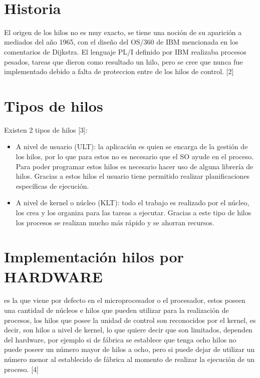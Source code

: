 \documentclass{article}
\begin{document}
\\[0,5cm]


\section{Historia}
El origen de los hilos no es muy exacto, se tiene una noción de su aparición a mediados del año 1965, con el diseño del OS/360 de IBM mencionada en los comentarios de Dijkstra. El lenguaje PL/I definido por IBM realizaba procesos pesados, tareas que dieron como resultado un hilo, pero se cree que nunca fue implementado debido a falta de proteccion entre de los hilos de control. [2]
\\[0.5cm]

\section{Tipos de hilos}

Existen 2 tipos de hilos [3]:

\begin{itemize}
\item  A nivel de usuario (ULT): la aplicación es quien se encarga de la gestión de los hilos, por lo que para estos no es necesario que el SO ayude en el proceso. Para poder programar estos hilos es necesario hacer uso de alguna librería de hilos. Gracias a estos hilos el usuario tiene permitido realizar planificaciones específicas de ejecución.
\item A nivel de kernel o núcleo (KLT): todo el trabajo es realizado por el núcleo, los crea y los organiza para las tareas a ejecutar. Gracias a este tipo de hilos los procesos se realizan mucho más rápido y se ahorran recursos.
\end{itemize}

\section{Implementación hilos por HARDWARE}
es la que viene por defecto en el microprocesador o el procesador, estos poseen una cantidad de núcleos e hilos que pueden utilizar para la realización de procesos, los hilos que posee la unidad de control son reconocidos por el kernel, es decir, son hilos a nivel de kernel, lo que quiere decir que son limitados, dependen del hardware, por ejemplo si de fábrica se establece que tenga ocho hilos no puede poseer un número mayor de hilos a ocho, pero si puede dejar de utilizar un número menor al establecido de fábrica al momento de realizar la ejecución de un proceso. [4]
\\[0.5cm]
\end{document}
